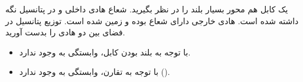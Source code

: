 
\begin{ELexample}{}

یک کابل هم محور بسیار بلند را در نظر بگیرید. شعاع هادی داخلی  و در پتانسیل  نگه داشته شده است. هادی خارجی دارای شعاع  بوده و زمین شده است. توزیع پتانسیل در فضای بین دو هادی را بدست آورید.


\begin{ELsolution}

\begin{itemize}
\tightlist
\item
  با توجه به بلند بودن کابل، وابستگی به  وجود ندارد.
\item
  با توجه به تقارن، وابستگی به \ELim{\phi} وجود ندارد ().
\end{itemize}


\end{ELsolution}

\end{ELexample}


